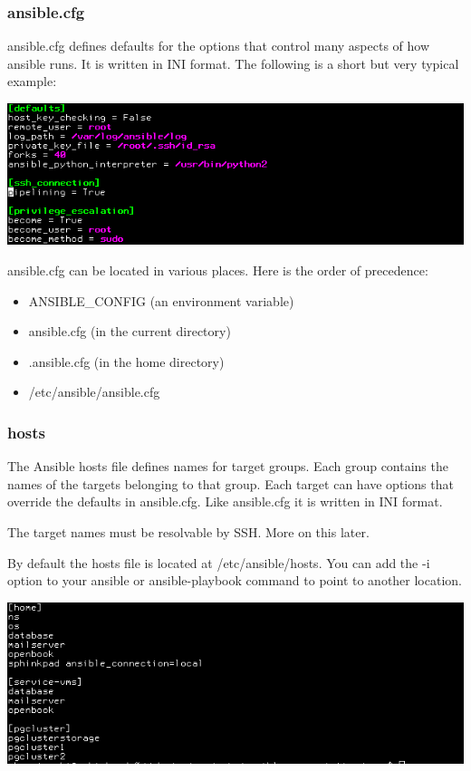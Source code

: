\documentclass[helvetica,english,utf8,notitle,nologo]{beamer}
\begin{document}
\begin{frame}
  \frametitle{ansible.cfg}

  ansible.cfg defines defaults for the options that control many
  aspects of how ansible runs. It is written in INI format. The
  following is a short but very typical example:

  \includegraphics[scale=0.44]{img_1}

  ansible.cfg can be located in various places. Here is the order of
  precedence:

  \begin{itemize}
  \item ANSIBLE\_CONFIG (an environment variable)
  \item ansible.cfg (in the current directory)
  \item .ansible.cfg (in the home directory)
  \item /etc/ansible/ansible.cfg
  \end{itemize}
\end{frame}

\begin{frame}
  \frametitle{hosts}

  The Ansible hosts file defines names for target groups. Each group
  contains the names of the targets belonging to that group. Each
  target can have options that override the defaults in
  ansible.cfg. Like ansible.cfg it is written in INI format.

  The target names must be resolvable by SSH. More on this later.

  By default the hosts file is located at /etc/ansible/hosts. You can
  add the -i option to your ansible or ansible-playbook command to
  point to another location.

  \includegraphics[scale=0.44]{img_2}
\end{frame}
\end{document}
